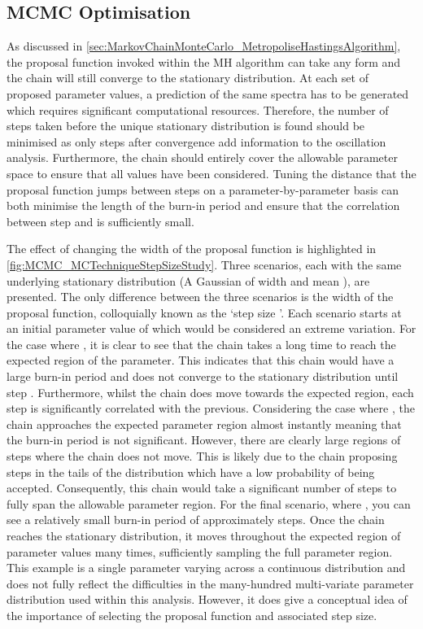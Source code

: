 \subsection{MCMC Optimisation}
\label{sec:MarkovChainMonteCarlo_MCMCOptimisation}
As discussed in \autoref{sec:MarkovChainMonteCarlo_MetropoliseHastingsAlgorithm}, the proposal function invoked within the MH algorithm can take any form and the chain will still converge to the stationary distribution. At each set of proposed parameter values, a prediction of the same spectra has to be generated which requires significant computational resources. Therefore, the number of steps taken before the unique stationary distribution is found should be minimised as only steps after convergence add information to the oscillation analysis. Furthermore, the chain should entirely cover the allowable parameter space to ensure that all values have been considered. Tuning the distance that the proposal function jumps between steps on a parameter-by-parameter basis can both minimise the length of the burn-in period and ensure that the correlation between step  and  is sufficiently small.

The effect of changing the width of the proposal function is highlighted in \autoref{fig:MCMC_MCTechniqueStepSizeStudy}. Three scenarios, each with the same underlying stationary distribution (A Gaussian of width  and mean ), are presented. The only difference between the three scenarios is the width of the proposal function, colloquially known as the `step size \quickmath{\sigma}'. Each scenario starts at an initial parameter value of  which would be considered an extreme variation. For the case where , it is clear to see that the chain takes a long time to reach the expected region of the parameter. This indicates that this chain would have a large burn-in period and does not converge to the stationary distribution until step . Furthermore, whilst the chain does move towards the expected region, each step is significantly correlated with the previous. Considering the case where , the chain approaches the expected parameter region almost instantly meaning that the burn-in period is not significant. However, there are clearly large regions of steps where the chain does not move. This is likely due to the chain proposing steps in the tails of the distribution which have a low probability of being accepted. Consequently, this chain would take a significant number of steps to fully span the allowable parameter region. For the final scenario, where , you can see a relatively small burn-in period of approximately  steps. Once the chain reaches the stationary distribution, it moves throughout the expected region of parameter values many times, sufficiently sampling the full parameter region. This example is a single parameter varying across a continuous distribution and does not fully reflect the difficulties in the many-hundred multi-variate parameter distribution used within this analysis. However, it does give a conceptual idea of the importance of selecting the proposal function and associated step size. 

